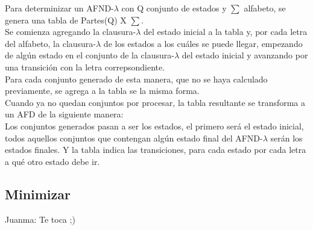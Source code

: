 Para determinizar un AFND-$\lambda$ con Q conjunto de estados y $\sum$ alfabeto, se genera una tabla de Partes(Q) X $\sum$.\\
Se comienza agregando la clausura-$\lambda$ del estado inicial a la tabla y, por cada letra del alfabeto, la clausura-$\lambda$ de los estados a los cuáles se puede llegar, empezando de algún estado en el conjunto de la clausura-$\lambda$ del estado inicial y avanzando por una transición con la letra correpsondiente.\\
Para cada conjunto generado de esta manera, que no se haya calculado previamente, se agrega a la tabla se la misma forma.\\
Cuando ya no quedan conjuntos por procesar, la tabla resultante se transforma a un AFD de la siguiente manera:\\
Los conjuntos generados pasan a ser los estados, el primero será el estado inicial, todos aquellos conjuntos que contengan algún estado final del AFND-$\lambda$ serán los estados finales. Y la tabla indica las transiciones, para cada estado por cada letra a qué otro estado debe ir.


\subsection{Minimizar}
Juanma: Te toca ;)
